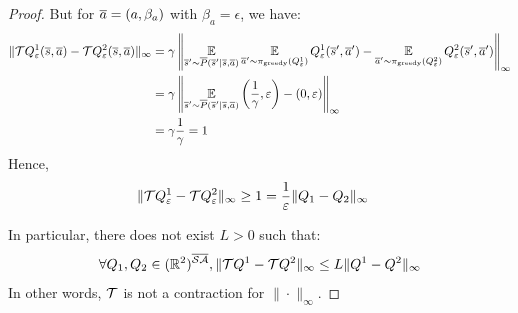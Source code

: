 \begin{proof}
But for $\overline{a}=(a,\beta_a)$ with $\beta_a = \epsilon$, we have:
\begin{align*}
    \|\mathcal{T} Q_\varepsilon^1(\overline{s}, \overline{a}) - \mathcal{T} Q_\varepsilon^2(\overline{s}, \overline{a})\|_\infty &= \gamma\left\|\operatorname*{\mathbb{E}}\limits_{\overline{s}'\sim\overline{P}(\overline{s}'|\overline{s},\overline{a})} \operatorname*{\mathbb{E}}\limits_{\overline{a}'\sim\pi_\text{greedy}(Q^1_\varepsilon)}Q^1_\varepsilon(\overline{s}',\overline{a}') - \operatorname*{\mathbb{E}}\limits_{\overline{a}'\sim\pi_\text{greedy}(Q^2_\varepsilon)}Q^2_\varepsilon(\overline{s}',\overline{a}')\right\|_\infty \\
    &= \gamma\left\|\operatorname*{\mathbb{E}}\limits_{\overline{s}'\sim\overline{P}(\overline{s}'|\overline{s},\overline{a})}\left(\frac{1}{\gamma}, \varepsilon\right) - (0, \varepsilon)\right\|_\infty \\
    &= \gamma\frac{1}{\gamma} = 1
\end{align*}
Hence, 
\begin{align*}
    \|\mathcal{T} Q_\varepsilon^1 - \mathcal{T} Q_\varepsilon^2\|_\infty &\geq 1 = \frac{1}{\varepsilon} \|Q_1-Q_2\|_\infty
\end{align*}

In particular, there does not exist $L>0$ such that:
$$\forall Q_1,Q_2\in(\mathbb{R}^2)^{\overline{\mathcal{S}}\overline{\mathcal{A}}}, \|\mathcal{T} Q^1 - \mathcal{T} Q^2\|_\infty \leq L \|Q^1 - Q^2\|_\infty$$
In other words, $\mathcal{T}$ is not a contraction for $\|\cdot\|_\infty$.
\end{proof}

